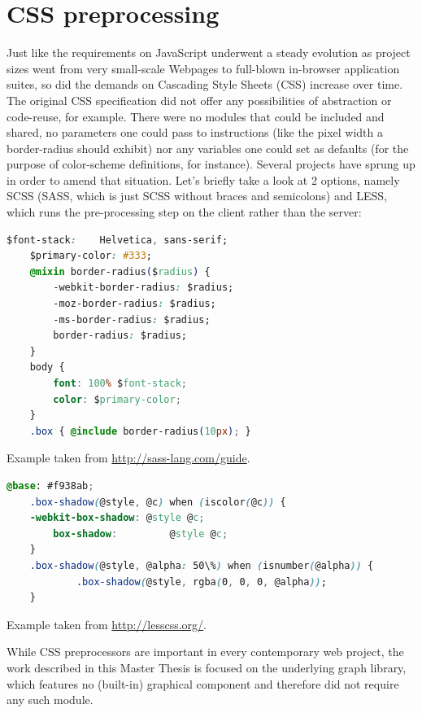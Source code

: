 \section{CSS preprocessing}
\label{sect:css_preproc}

	Just like the requirements on JavaScript underwent a steady evolution as project sizes went from very small-scale Webpages to full-blown in-browser application suites, so did the demands on Cascading Style Sheets (CSS) increase over time. The original CSS specification did not offer any possibilities of abstraction or code-reuse, for example. There were no modules that could be included and shared, no parameters one could pass to instructions (like the pixel width a border-radius should exhibit) nor any variables one could set as defaults (for the purpose of color-scheme definitions, for instance). Several projects have sprung up in order to amend that situation. Let's briefly take a look at 2 options, namely SCSS (SASS, which is just SCSS without braces and semicolons) and LESS, which runs the pre-processing step on the client rather than the server:
	
	\begin{lstlisting}[caption={SCSS example demonstrating the use of variables and mixings}, label={fig:scss_preproc}, language=CSS]
	$font-stack:    Helvetica, sans-serif;
	$primary-color: #333;
	@mixin border-radius($radius) {
		-webkit-border-radius: $radius;
		-moz-border-radius: $radius;
		-ms-border-radius: $radius;
		border-radius: $radius;
	}
	body {
		font: 100% $font-stack;
		color: $primary-color;
	}	
	.box { @include border-radius(10px); }
	\end{lstlisting}
	\small
	Example taken from \url{http://sass-lang.com/guide}.
	
	
	\begin{lstlisting}[caption={LESS example demonstrating the use of variables and default parameters}, label={fig:less_preproc}, language=CSS]
	@base: #f938ab;	
	.box-shadow(@style, @c) when (iscolor(@c)) {
	-webkit-box-shadow: @style @c;
		box-shadow:         @style @c;
	}
	.box-shadow(@style, @alpha: 50\%) when (isnumber(@alpha)) {
			.box-shadow(@style, rgba(0, 0, 0, @alpha));
	}
	\end{lstlisting}
	\small
	Example taken from \url{http://lesscss.org/}.
	
	While CSS preprocessors are important in every contemporary web project, the work described in this Master Thesis is focused on the underlying graph library, which features no (built-in) graphical component and therefore did not require any such module.
	
